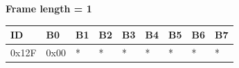 \documentclass{article}
\begin{document}
\textbf{Frame length = 1}
\begin{center}
    \begin{tabular}{| p{20pt} | p{40pt} | p{55pt} | p{55pt} | p{40pt} | p{40pt} | p{40pt} | p{40pt} | p{40pt} |}
        \hline
        ID    & B0  & B1       & B2 & B3 & B4 & B5 & B6 & B7 \\
        \hline
        0x12F & 0x00 & * & *  & *  & *  & *  & *  & *  \\
        \hline
    \end{tabular}
\end{center}
\end{document}
